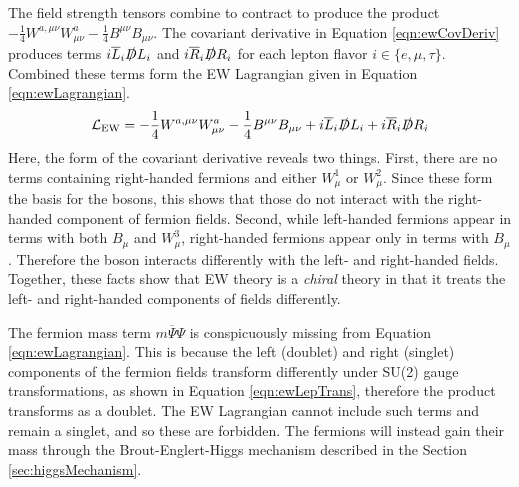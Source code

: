 The field strength tensors combine to contract to produce the product $-\frac{1}{4}W^{a,\mu\nu}W^{a}_{\mu\nu}-\frac{1}{4}B^{\mu\nu}B_{\mu\nu}$.
The covariant derivative in Equation \ref{eqn:ewCovDeriv} produces terms $i\overline{L}_i\slashed{D}L_i$ and $i\overline{R}_i\slashed{D}R_i$ for each lepton flavor $i\in\{e,\mu,\tau\}$. 
Combined these terms form the EW Lagrangian given in Equation \ref{eqn:ewLagrangian}.
\begin{equation}\begin{split}\label{eqn:ewLagrangian}
\mathcal{L}_\text{EW} = -\frac{1}{4}W^{a,\mu\nu}W^{a}_{\mu\nu}-\frac{1}{4}B^{\mu\nu}B_{\mu\nu}+i\overline{L}_i\slashed{D}L_i+i\overline{R}_i\slashed{D}R_i
\end{split}\end{equation} 
Here, the form of the covariant derivative reveals two things.
First, there are no terms containing right-handed fermions and either $W^1_\mu$ or $W^2_\mu$. Since these form the basis for the \W bosons, this shows that those do not interact with the right-handed component of fermion fields.
Second, while left-handed fermions appear in terms with both $B_\mu$ and $W^3_\mu$, right-handed fermions appear only in terms with $B_\mu$. Therefore the \Z boson interacts differently with the left- and right-handed fields.
Together, these facts show that EW theory is a \emph{chiral} theory in that it treats the left- and right-handed components of fields differently.

The fermion mass term $m\overline{\Psi}\Psi$ is conspicuously missing from Equation \ref{eqn:ewLagrangian}.
This is because the left (doublet) and right (singlet) components of the fermion fields transform differently under SU(2) gauge transformations, as shown in Equation \ref{eqn:ewLepTrans}, therefore the product transforms as a doublet.
The EW Lagrangian cannot include such terms and remain a singlet, and so these are forbidden.
The fermions will instead gain their mass through the Brout-Englert-Higgs mechanism described in the Section \ref{sec:higgsMechanism}.

